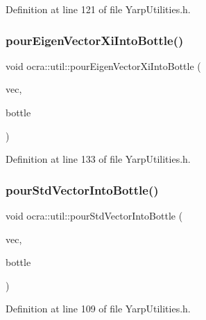 Definition at line 121 of file Yarp\+Utilities.\+h.

\hypertarget{namespaceocra_1_1util_a8dd17e44dac9cc815cfc9f009afc8633}{}\label{namespaceocra_1_1util_a8dd17e44dac9cc815cfc9f009afc8633} 
\subsubsection{\texorpdfstring{pour\+Eigen\+Vector\+Xi\+Into\+Bottle()}{pourEigenVectorXiIntoBottle()}}
{\footnotesize\ttfamily void ocra\+::util\+::pour\+Eigen\+Vector\+Xi\+Into\+Bottle (\begin{DoxyParamCaption}\item[{const Eigen\+::\+Vector\+Xi \&}]{vec,  }\item[{yarp\+::os\+::\+Bottle \&}]{bottle }\end{DoxyParamCaption})\hspace{0.3cm}{\ttfamily [inline]}}



Definition at line 133 of file Yarp\+Utilities.\+h.

\hypertarget{namespaceocra_1_1util_abe236d2f67284737d18ea3f5913aacab}{}\label{namespaceocra_1_1util_abe236d2f67284737d18ea3f5913aacab} 
\subsubsection{\texorpdfstring{pour\+Std\+Vector\+Into\+Bottle()}{pourStdVectorIntoBottle()}}
{\footnotesize\ttfamily void ocra\+::util\+::pour\+Std\+Vector\+Into\+Bottle (\begin{DoxyParamCaption}\item[{const std\+::vector$<$ double $>$ \&}]{vec,  }\item[{yarp\+::os\+::\+Bottle \&}]{bottle }\end{DoxyParamCaption})\hspace{0.3cm}{\ttfamily [inline]}}



Definition at line 109 of file Yarp\+Utilities.\+h.

\hypertarget{namespaceocra_1_1util_abfc4d8245c114e3ac49b4cbffe90851c}{}\label{namespaceocra_1_1util_abfc4d8245c114e3ac49b4cbffe90851c} 
